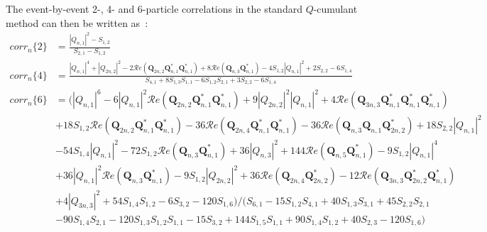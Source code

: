 The event-by-event 2-, 4- and 6-particle correlations in the standard $Q$-cumulant method can then be written as~\cite{Bilandzic:2010jr}:
\begin{equation}
\begin{split}
corr_n\{2\}&=\frac{|Q_{n,1}|^2-S_{1,2}}{S_{2,1}-S_{1,2}} \\
corr_n\{4\}&=\frac{|Q_{n,1}|^4+|Q_{2n,2}|^2-2\mathcal{R}\textit{e}(\pmb{Q}_{2n,2}\pmb{Q}_{n,1}^*\pmb{Q}_{n,1}^*)+8\mathcal{R}\textit{e}(\pmb{Q}_{n,3}\pmb{Q}_{n,1}^*)-4S_{1,2}|Q_{n,1}|^2+2S_{2,2}-6S_{1,4}}{S_{4,1}+8S_{1,3}S_{1,1}-6S_{1,2}S_{2,1}+3S_{2,2}-6S_{1,4}} \\
corr_n\{6\}&=(|Q_{n,1}|^6-6|Q_{n,1}|^2\mathcal{R}\textit{e}(\pmb{Q}_{2n,2}\pmb{Q}_{n,1}^*\pmb{Q}_{n,1}^*)+9|Q_{2n,2}|^2|Q_{n,1}|^2+4\mathcal{R}\textit{e}(\pmb{Q}_{3n,3}\pmb{Q}_{n,1}^*\pmb{Q}_{n,1}^*\pmb{Q}_{n,1}^*) \\
&+18S_{1,2}\mathcal{R}\textit{e}(\pmb{Q}_{2n,2}\pmb{Q}_{n,1}^*\pmb{Q}_{n,1}^*)-36\mathcal{R}\textit{e}(\pmb{Q}_{2n,4}\pmb{Q}_{n,1}^*\pmb{Q}_{n,1}^*)-36\mathcal{R}\textit{e}(\pmb{Q}_{n,3}\pmb{Q}_{n,1}\pmb{Q}_{2n,2}^*)+18S_{2,2}|Q_{n,1}|^2 \\
&-54S_{1,4}|Q_{n,1}|^2-72S_{1,2}\mathcal{R}\textit{e}(\pmb{Q}_{n,3}\pmb{Q}_{n,1}^*)+36|Q_{n,3}|^2+144\mathcal{R}\textit{e}(\pmb{Q}_{n,5}\pmb{Q}_{n,1}^*)-9S_{1,2}|Q_{n,1}|^4 \\
&+36|Q_{n,1}|^2\mathcal{R}\textit{e}(\pmb{Q}_{n,3}\pmb{Q}_{n,1}^*)-9S_{1,2}|Q_{2n,2}|^2+36\mathcal{R}\textit{e}(\pmb{Q}_{2n,4}\pmb{Q}_{2n,2}^*)-12\mathcal{R}\textit{e}(\pmb{Q}_{3n,3}\pmb{Q}_{2n,2}^*\pmb{Q}_{n,1}^*) \\
&+4|Q_{3n,3}|^2+54S_{1,4}S_{1,2}-6S_{3,2}-120S_{1,6})/(S_{6,1}-15S_{1,2}S_{4,1}+40S_{1,3}S_{3,1}+45S_{2,2}S_{2,1} \\
&-90S_{1,4}S_{2,1}-120S_{1,3}S_{1,2}S_{1,1}-15S_{3,2}+144S_{1,5}S_{1,1}+90S_{1,4}S_{1,2}+40S_{2,3}-120S_{1,6})
\end{split}
\end{equation}




